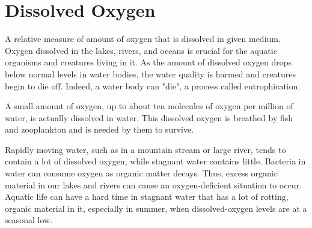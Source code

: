 \documentclass[a4paper]{article}
\begin{document}
\begin{minipage}[t]{0.45\textwidth}
\section*{\small Dissolved Oxygen}
{\normalsize A relative measure of amount of oxygen that is dissolved in given medium. Oxygen dissolved in the lakes, rivers, and oceans is crucial for the aquatic organisms and creatures living in it.
As the amount of dissolved oxygen drops below normal levels in water bodies, the water quality is harmed and creatures begin to die off. Indeed, a water body can "die", a process called eutrophication.\\ \par
A small amount of oxygen, up to about ten molecules of oxygen per million of water, is actually dissolved in water. This dissolved oxygen is breathed by fish and zooplankton and is needed by them to survive.\\ \par
Rapidly moving water, such as in a mountain stream or large river, tends to contain a lot of dissolved oxygen, while stagnant water contains little. Bacteria in water can consume oxygen as organic matter decays. Thus, excess organic material in our lakes and rivers can cause an oxygen-deficient situation to occur. Aquatic life can have a hard time in stagnant water that has a lot of rotting, organic material in it, especially in summer, when dissolved-oxygen levels are at a seasonal low.}
\end{minipage} 
\newpage
\end{document}
